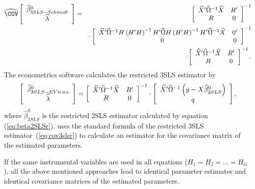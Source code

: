 \begin{eqnarray}
   \COVHat
   \left[ \begin{array}{c}
      \widehat{\beta}^0_{3SLS-Schmidt} \\ \widehat{\lambda}
   \end{array} \right] 
   & = & 
   \left[ \begin{array}{cc}
      \widehat{X}' \OHat^{-1} \widehat{X} & R' \\
      R & 0
   \end{array} \right]^{-1}
   \\
   & & \cdot
   \left[ \begin{array}{cc}
      \widehat{X}' \OHat^{-1} H \left( H' H \right)^{-1} H' \OHat
      H \left( H' H \right)^{-1} H' \OHat^{-1} \widehat{X} & 0' \\
      0 & 0
   \end{array} \right]^{-1}
   \nonumber \\
   & & \cdot
   \left[ \begin{array}{cc}
      \widehat{X}' \OHat^{-1} \widehat{X} & R' \\
      R & 0
   \end{array} \right]^{-1} .
   \nonumber
\end{eqnarray}
The econometrics software  calculates the restricted 3SLS estimator by
\begin{equation}
   \left[ \begin{array}{c}
      \widehat{\beta}^0_{3SLS-EViews} \\ \widehat{\lambda}
   \end{array} \right]
   =
   \left[ \begin{array}{cc}
      \widehat{X}' \widehat{\Omega}^{-1} \widehat{X} & R' \\
      R & 0
   \end{array} \right]^{-1}
   \cdot
   \left[ \begin{array}{c}
      \widehat{X}' \widehat{\Omega}^{-1} \left( y - X \widehat{\beta}^0_{2SLS} \right)
      \\ q 
   \end{array} \right] ,
   \label{eq:3slsEViewsR}
\end{equation}
where $\widehat{\beta}^0_{2SLS}$ is the restricted 2SLS estimator calculated
by equation (\ref{eq:beta2SLSr}). 
 uses the standard formula of the restricted 3SLS
estimator~(\ref{eq:cov3slsr}) to calculate an estimator
for the covariance matrix of the estimated parameters.


If the same instrumental variables are used in all equations 
($H_1 = H_2 = \ldots = H_G$), 
all the above mentioned approaches lead to identical parameter estimates
and identical covariance matrices of the estimated parameters.

